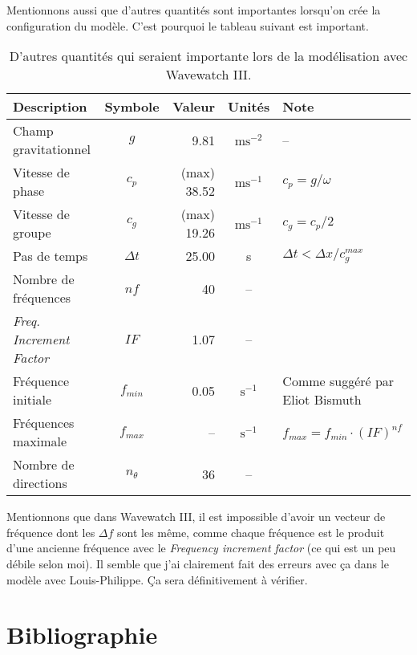 \documentclass[10pt]{article}
\numberwithin{equation}{section}
\begin{document}
Mentionnons aussi que d'autres quantités sont importantes lorsqu'on crée la configuration du modèle.
C'est pourquoi le tableau suivant est important.

\begin{table}[!h]
\caption{D'autres quantités qui seraient importante lors de la modélisation avec Wavewatch III.}
\centering
\begin{tabular}{lcrcl}
\hline
\hline
Description & Symbole & Valeur & Unités & Note\\
\hline
Champ gravitationnel & \(g\) & 9.81 & \(\mathrm{ms}^{-2}\) & --\\
Vitesse de phase & \(c_p\) & (max) 38.52 & \(\mathrm{ms}^{-1}\) & \(c_p = g/\omega\)\\
Vitesse de groupe & \(c_g\) & (max) 19.26 & \(\mathrm{ms}^{-1}\) & \(c_g = c_p/2\)\\
Pas de temps & \(\Delta t\) & 25.00 & s & \(\Delta t < \Delta x/c^{max}_g\)\\
\hline
Nombre de fréquences & \(nf\) & 40 & -- & \autocite[Voir][switch NL2]{wwiii2016user}\\
\emph{Freq. Increment Factor} & \(IF\) & 1.07 & -- & \autocite[Voir][switch NL2]{wwiii2016user}\\
Fréquence initiale & \(f_{min}\) & 0.05 & \(\mathrm{s}^{-1}\) & Comme suggéré par Eliot Bismuth\\
Fréquences maximale & \(f_{max}\) & -- & \(\mathrm{s}^{-1}\) & \(f_{max} = f_{min}\cdot(IF)^{nf}\)\\
Nombre de directions & \(n_\theta\) & 36 & -- & \autocite[Voir][switch NL2]{wwiii2016user}\\
\hline
\end{tabular}
\end{table}

Mentionnons que dans Wavewatch III, il est impossible d'avoir un vecteur de fréquence dont les \(\Delta f\) sont les même, comme chaque fréquence est le produit d'une ancienne fréquence avec le \emph{Frequency increment factor} (ce qui est un peu débile selon moi).
Il semble que j'ai clairement fait des erreurs avec ça dans le modèle avec Louis-Philippe.
Ça sera définitivement à vérifier. 
\section{Bibliographie}
\label{sec:org4e3e49d}
\printbibliography
\end{document}
